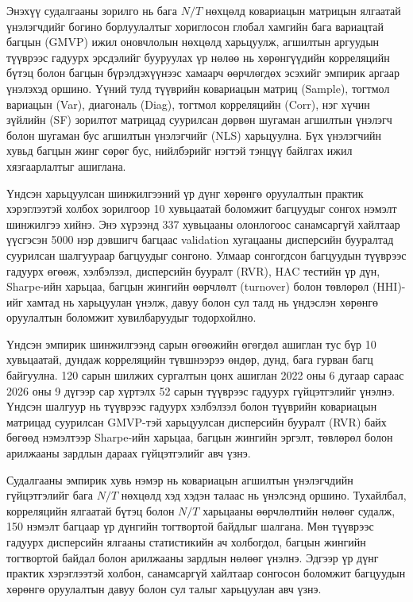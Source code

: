 Энэхүү судалгааны зорилго нь бага \(N/T\) нөхцөлд ковариацын матрицын ялгаатай үнэлэгчдийг богино борлуулалтыг хориглосон глобал хамгийн бага вариацтай багцын (GMVP) ижил оновчлолын нөхцөлд харьцуулж, агшилтын аргуудын түүврээс гадуурх эрсдэлийг бууруулах үр нөлөө нь хөрөнгүүдийн корреляцийн бүтэц болон багцын бүрэлдэхүүнээс хамаарч өөрчлөгдөх эсэхийг эмпирик аргаар үнэлэхэд оршино. Үүний тулд түүврийн ковариацын матриц (Sample), тогтмол вариацын (Var), диагональ (Diag), тогтмол корреляцийн (Corr), нэг хүчин зүйлийн (SF) зорилтот матрицад суурилсан дөрвөн шугаман агшилтын үнэлэгч болон шугаман бус агшилтын үнэлэгчийг (NLS) харьцуулна. Бүх үнэлэгчийн хувьд багцын жинг сөрөг бус, нийлбэрийг нэгтэй тэнцүү байлгах ижил хязгаарлалтыг ашиглана.

Үндсэн харьцуулсан шинжилгээний үр дүнг хөрөнгө оруулалтын практик хэрэглээтэй холбох зорилгоор 10 хувьцаатай боломжит багцуудыг сонгох нэмэлт шинжилгээ хийнэ. Энэ хүрээнд 337 хувьцааны олонлогоос санамсаргүй хайлтаар үүсгэсэн 5000 нэр дэвшигч багцаас validation хугацааны дисперсийн бууралтад суурилсан шалгуураар багцуудыг сонгоно. Улмаар сонгогдсон багцуудын түүврээс гадуурх өгөөж, хэлбэлзэл, дисперсийн бууралт (RVR), HAC тестийн үр дүн, Sharpe-ийн харьцаа, багцын жингийн өөрчлөлт (turnover) болон төвлөрөл (HHI)-ийг хамтад нь харьцуулан үнэлж, давуу болон сул талд нь үндэслэн хөрөнгө оруулалтын боломжит хувилбаруудыг тодорхойлно.

Үндсэн эмпирик шинжилгээнд сарын өгөөжийн өгөгдөл ашиглан тус бүр 10 хувьцаатай, дундаж корреляцийн түвшнээрээ өндөр, дунд, бага гурван багц байгуулна. 120 сарын шилжих сургалтын цонх ашиглан 2022 оны 6 дугаар сараас 2026 оны 9 дүгээр сар хүртэлх 52 сарын түүврээс гадуурх гүйцэтгэлийг үнэлнэ. Үндсэн шалгуур нь түүврээс гадуурх хэлбэлзэл болон түүврийн ковариацын матрицад суурилсан GMVP-тэй харьцуулсан дисперсийн бууралт (RVR) байх бөгөөд нэмэлтээр Sharpe-ийн харьцаа, багцын жингийн эргэлт, төвлөрөл болон арилжааны зардлын дараах гүйцэтгэлийг авч үзнэ.

Судалгааны эмпирик хувь нэмэр нь ковариацын агшилтын үнэлэгчдийн гүйцэтгэлийг бага \(N/T\) нөхцөлд хэд хэдэн талаас нь үнэлсэнд оршино. Тухайлбал, корреляцийн ялгаатай бүтэц болон \(N/T\) харьцааны өөрчлөлтийн нөлөөг судалж, 150 нэмэлт багцаар үр дүнгийн тогтвортой байдлыг шалгана. Мөн түүврээс гадуурх дисперсийн ялгааны статистикийн ач холбогдол, багцын жингийн тогтвортой байдал болон арилжааны зардлын нөлөөг үнэлнэ. Эдгээр үр дүнг практик хэрэглээтэй холбон, санамсаргүй хайлтаар сонгосон боломжит багцуудын хөрөнгө оруулалтын давуу болон сул талыг харьцуулан авч үзнэ.

